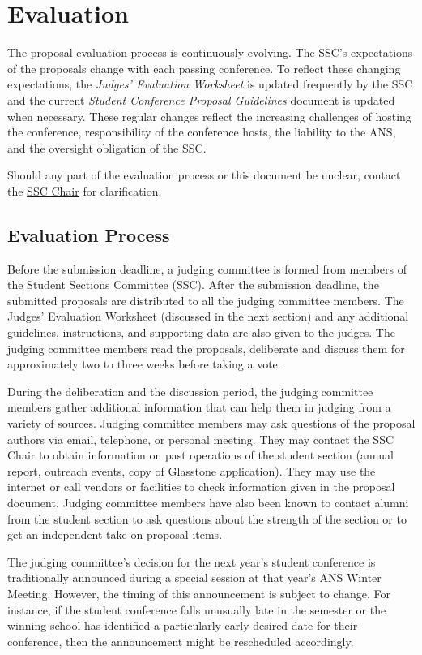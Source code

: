\documentclass[12pt]{article}
\begin{document}
\newpage
\section{Evaluation} \label{sec:Eval}
The proposal evaluation process is continuously evolving. The SSC’s expectations of the proposals change with each passing conference. To reflect these changing expectations, the \textit{Judges’ Evaluation Worksheet} is updated frequently by the SSC and the current \textit{Student Conference Proposal Guidelines} document is updated when necessary.
These regular changes reflect the increasing challenges of hosting the conference, responsibility of the conference hosts, the liability to the ANS, and the oversight obligation of the SSC.

Should any part of the evaluation process or this document be unclear, contact the \href{mailto:sscChair@gmail.com}{SSC Chair} for clarification.

\subsection{Evaluation Process}
Before the submission deadline, a judging committee is formed from members of the
Student Sections Committee (SSC). After the submission deadline, the submitted
proposals are distributed to all the judging committee members. The Judges’ Evaluation
Worksheet (discussed in the next section) and any additional guidelines, instructions, and supporting data are also given to the judges. The judging committee members read the proposals, deliberate and discuss them for approximately two to three weeks before
taking a vote.

During the deliberation and the discussion period, the judging committee members gather additional information that can help them in judging from a variety of sources.
Judging committee members may ask questions of the proposal authors via email, telephone, or personal meeting.
They may contact the SSC Chair to obtain information on past operations of the student section (annual report, outreach events, copy of Glasstone application). They may use the internet or call vendors or facilities to check information given in the proposal document. Judging committee members have also been known to contact alumni from the student section to ask questions about the strength of the section or to get an independent take on proposal items.

The judging committee’s decision for the next year's student conference is traditionally announced during a special session at that year's ANS Winter Meeting.
However, the timing of this announcement is subject to change. For instance, if the student conference falls unusually late in the semester or the winning school has identified a particularly early desired date for their conference, then the announcement might be rescheduled accordingly.
\end{document}
